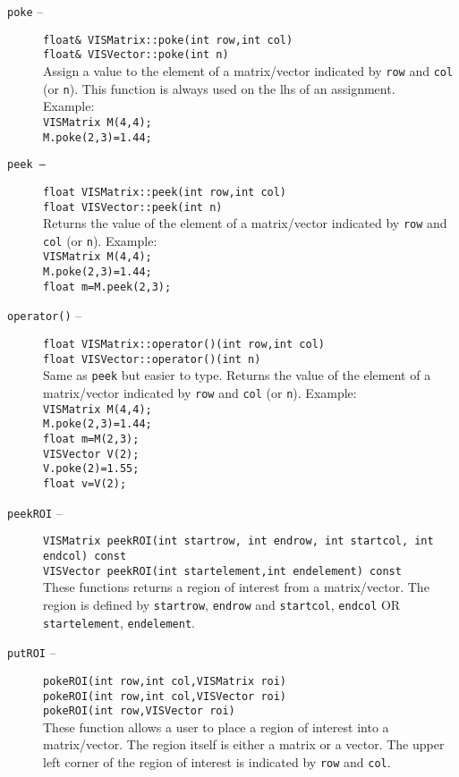 \begin{description}
\item[{\tt poke} --]
{\tt float\& VISMatrix::poke(int row,int col)}\\
{\tt float\& VISVector::poke(int n)}\\
  Assign a value to the element of a matrix/vector indicated by
{\tt row} and {\tt col} (or {\tt n}).  This function is
always used on the lhs of an assignment.\\
  Example:\\
  {\tt VISMatrix M(4,4);}\\
  {\tt M.poke(2,3)=1.44;}
 \item[{\tt peek --}]
{\tt float VISMatrix::peek(int row,int col)}\\
{\tt float VISVector::peek(int n)}\\
Returns the value of the element of a matrix/vector indicated by
{\tt row} and {\tt col} (or {\tt n}).
 Example:\\
  {\tt VISMatrix M(4,4);}\\
  {\tt M.poke(2,3)=1.44;}\\
  {\tt float m=M.peek(2,3);}
 \item [{\tt operator()} --]
{\tt float VISMatrix::operator()(int row,int col)}\\
{\tt float VISVector::operator()(int n)}\\
Same as {\tt peek} but easier to type.
Returns the value of the element of a matrix/vector indicated by
{\tt row} and {\tt col} (or {\tt n}).
 Example:\\
  {\tt VISMatrix M(4,4);}\\
  {\tt M.poke(2,3)=1.44;}\\
  {\tt float m=M(2,3);}\\
  {\tt VISVector V(2);}\\
  {\tt V.poke(2)=1.55;}\\
  {\tt float v=V(2);}


\item[{\tt peekROI} --]
{\tt VISMatrix peekROI(int startrow, int endrow, int startcol, int endcol)
const}\\
{\tt VISVector peekROI(int startelement,int endelement) const}\\
These functions returns a region of interest from a matrix/vector.
The region is defined by {\tt startrow}, {\tt endrow} and {\tt startcol},
{\tt endcol} OR {\tt startelement}, {\tt endelement}.

\item[{\tt putROI} --]
{\tt pokeROI(int row,int col,VISMatrix roi)}\\
{\tt pokeROI(int row,int col,VISVector roi)}\\
{\tt pokeROI(int row,VISVector roi)}\\
These function allows a user to place a region of interest into a
matrix/vector.
The region itself is either a matrix or a vector.
The upper left corner of the region of interest is indicated by {\tt row}
and {\tt col}.
\end{description}
